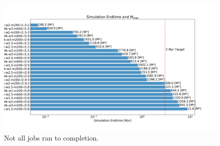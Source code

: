 \documentclass[preprint1]{aastex}
\numberwithin{equation}{section}
\begin{document}
\begin{figure}
    \centering
    \includegraphics{JobProgress}
    \caption{Not all jobs ran to completion. }
    \label{fig:JobProgress}
\end{figure}
\end{document}

